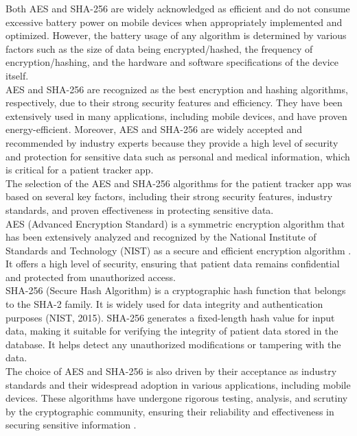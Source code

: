 \documentclass[12pt]{article}
\begin{document}
			Both AES and SHA-256 are widely acknowledged as efficient and do not consume excessive battery power on mobile devices when appropriately implemented and optimized. However, the battery usage of any algorithm is determined by various factors such as the size of data being encrypted/hashed, the frequency of encryption/hashing, and the hardware and software specifications of the device itself.\\
			
			AES and SHA-256 are recognized as the best encryption and hashing algorithms, respectively, due to their strong security features and efficiency. They have been extensively used in many applications, including mobile devices, and have proven energy-efficient. Moreover, AES and SHA-256 are widely accepted and recommended by industry experts because they provide a high level of security and protection for sensitive data such as personal and medical information, which is critical for a patient tracker app.\\
			
			The selection of the AES and SHA-256 algorithms for the patient tracker app was based on several key factors, including their strong security features, industry standards, and proven effectiveness in protecting sensitive data.\\
			
			AES (Advanced Encryption Standard) is a symmetric encryption algorithm that has been extensively analyzed and recognized by the National Institute of Standards and Technology (NIST) as a secure and efficient encryption algorithm \cite{daemen2002design}. It offers a high level of security, ensuring that patient data remains confidential and protected from unauthorized access.\\
			
			SHA-256 (Secure Hash Algorithm) is a cryptographic hash function that belongs to the SHA-2 family. It is widely used for data integrity and authentication purposes (NIST, 2015). SHA-256 generates a fixed-length hash value for input data, making it suitable for verifying the integrity of patient data stored in the database. It helps detect any unauthorized modifications or tampering with the data.\\
			
			The choice of AES and SHA-256 is also driven by their acceptance as industry standards and their widespread adoption in various applications, including mobile devices. These algorithms have undergone rigorous testing, analysis, and scrutiny by the cryptographic community, ensuring their reliability and effectiveness in securing sensitive information \cite{tuli2013review}.\\
			
\end{document}
